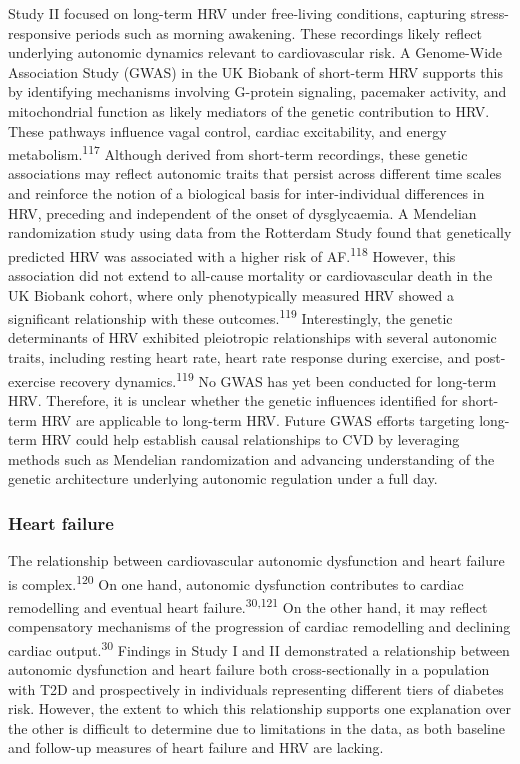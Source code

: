 \documentclass[
  a4paper,
  headsepline=true,
  open=left]{scrbook}
\begin{document}
Study II focused on long-term HRV under free-living conditions,
capturing stress-responsive periods such as morning awakening. These
recordings likely reflect underlying autonomic dynamics relevant to
cardiovascular risk. A Genome-Wide Association Study (GWAS) in the UK
Biobank of short-term HRV supports this by identifying mechanisms
involving G-protein signaling, pacemaker activity, and mitochondrial
function as likely mediators of the genetic contribution to HRV. These
pathways influence vagal control, cardiac excitability, and energy
metabolism.\textsuperscript{117} Although derived from short-term
recordings, these genetic associations may reflect autonomic traits that
persist across different time scales and reinforce the notion of a
biological basis for inter-individual differences in HRV, preceding and
independent of the onset of dysglycaemia. A Mendelian randomization
study using data from the Rotterdam Study found that genetically
predicted HRV was associated with a higher risk of
AF.\textsuperscript{118} However, this association did not extend to
all-cause mortality or cardiovascular death in the UK Biobank cohort,
where only phenotypically measured HRV showed a significant relationship
with these outcomes.\textsuperscript{119} Interestingly, the genetic
determinants of HRV exhibited pleiotropic relationships with several
autonomic traits, including resting heart rate, heart rate response
during exercise, and post-exercise recovery
dynamics.\textsuperscript{119} No GWAS has yet been conducted for
long-term HRV. Therefore, it is unclear whether the genetic influences
identified for short-term HRV are applicable to long-term HRV. Future
GWAS efforts targeting long-term HRV could help establish causal
relationships to CVD by leveraging methods such as Mendelian
randomization and advancing understanding of the genetic architecture
underlying autonomic regulation under a full day.

\hypertarget{heart-failure-1}{%
\subsubsection{Heart failure}\label{heart-failure-1}}

The relationship between cardiovascular autonomic dysfunction and heart
failure is complex.\textsuperscript{120} On one hand, autonomic
dysfunction contributes to cardiac remodelling and eventual heart
failure.\textsuperscript{30,121} On the other hand, it may reflect
compensatory mechanisms of the progression of cardiac remodelling and
declining cardiac output.\textsuperscript{30} Findings in Study I and II
demonstrated a relationship between autonomic dysfunction and heart
failure both cross-sectionally in a population with T2D and
prospectively in individuals representing different tiers of diabetes
risk. However, the extent to which this relationship supports one
explanation over the other is difficult to determine due to limitations
in the data, as both baseline and follow-up measures of heart failure
and HRV are lacking.
\end{document}
